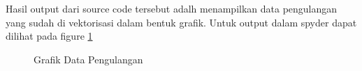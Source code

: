 \begin{enumerate}
Hasil output dari source code tersebut adalh menampilkan data pengulangan yang sudah di vektorisasi dalam bentuk grafik. Untuk output dalam spyder dapat dilihat pada figure \ref{YNC4-26}

	\begin{figure}[ht]
		\caption{Grafik Data Pengulangan}
		\label{YNC4-26}
	\end{figure}

\end{enumerate}

